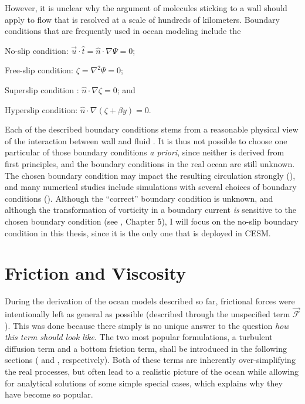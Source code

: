 However, it is unclear why the argument of molecules sticking to a wall should apply to flow that is resolved at a scale of hundreds of kilometers. Boundary conditions that are frequently used in ocean modeling include the
\begin{items}
\item No-slip condition: \(\vec{u} \cdot \hat{t} = \hat{n}\cdot\nabla\Psi = 0\);
\item Free-slip condition: \(\zeta = \nabla^2 \Psi = 0\);
\item Superslip condition%
	: \(\hat{n} \cdot \nabla \zeta = 0\); and
\item Hyperslip condition: \(\hat{n} \cdot \nabla (\zeta + \beta y) = 0\).
\end{items}

Each of the described boundary conditions stems from a reasonable physical view of the interaction between wall and fluid \citep{pedloskyoct}. It is thus not possible to choose one particular of those boundary conditions \emph{a priori}, since neither is derived from first principles, and the boundary conditions in the real ocean are still unknown. The chosen boundary condition may impact the resulting circulation strongly (), and many numerical studies include simulations with several choices of boundary conditions (\eg \cite{killworth}).
\parabreak
Although the \enquote{correct} boundary condition is unknown, and although the transformation of vorticity in a boundary current \emph{is} sensitive to the chosen boundary condition (see , Chapter 5), I will focus on the no-slip boundary condition in this thesis, since it is the only one that is deployed in \ac{CESM}.

\section{Friction and Viscosity}
\label{sec:physics-friction}
During the derivation of the ocean models described so far, frictional forces were intentionally left as general as possible (described through the unspecified term \(\vec{\mathcal{F}}\)). This was done because there simply is no unique answer to the question \emph{how this term should look like}. The two most popular formulations, a turbulent diffusion term and a bottom friction term, shall be introduced in the following sections ( and , respectively). Both of these terms are inherently over-simplifying the real processes, but often lead to a realistic picture of the ocean while allowing for analytical solutions of some simple special cases, which explains why they have become so popular.

